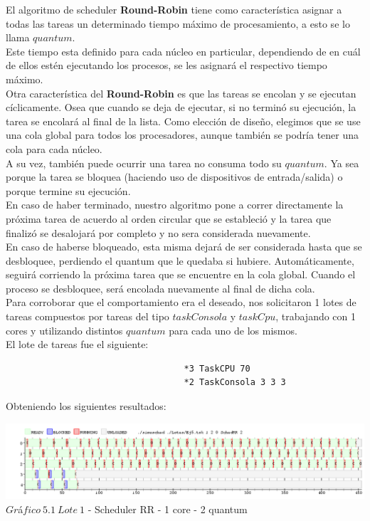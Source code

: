 \indent El algoritmo de scheduler \textbf{Round-Robin} tiene como caracter\'istica asignar a todas las tareas 
un determinado tiempo m\'aximo de procesamiento, a esto se lo llama $quantum$. \\
\indent Este tiempo esta definido para cada n\'ucleo en particular, dependiendo de en cu\'al de ellos est\'en 
ejecutando los procesos, se les asignar\'a el respectivo tiempo m\'aximo.\\
\indent Otra caracter\'istica del \textbf{Round-Robin} es que las tareas se encolan y se ejecutan c\'iclicamente. 
Osea que cuando se deja de ejecutar, si no termin\'o su ejecuci\'on, la tarea se encolar\'a al final de la lista. 
Como elecci\'on de diseño, elegimos que se use una cola global para todos los procesadores, aunque tambi\'en
se podr\'ia tener una cola para cada n\'ucleo. \\
\indent A su vez, tambi\'en puede ocurrir una tarea no consuma todo su $quantum$. 
Ya sea porque la tarea se bloquea (haciendo uso de dispositivos de entrada/salida) o porque termine su ejecuci\'on.\\
\indent En caso de haber terminado, nuestro algoritmo pone a correr directamente la pr\'oxima tarea de acuerdo al orden 
circular que se estableci\'o y la tarea que finaliz\'o se desalojar\'a por completo y no sera considerada nuevamente. \\
\indent En caso de haberse bloqueado, esta misma dejar\'a de ser considerada hasta que se desbloquee, 
perdiendo el quantum que le quedaba si hubiere. 
Autom\'aticamente, seguir\'a corriendo la pr\'oxima tarea que se encuentre en la cola global. 
Cuando el proceso se desbloquee, ser\'a encolada nuevamente al final de dicha cola.   \\

\indent Para corroborar que el comportamiento era el deseado, nos solicitaron 1 lotes de tareas compuestos por tareas
del tipo $taskConsola$ y $taskCpu$, trabajando con 1 cores y utilizando distintos $quantum$ para cada uno de los mismos.\\


El lote de tareas fue el siguiente:
\begin{verbatim}
                                   *3 TaskCPU 70
                                   *2 TaskConsola 3 3 3
\end{verbatim}

Obteniendo los siguientes resultados:

\begin{center}

    
	\includegraphics[width=450pt]{ej5quantum2.png}
	{$Gr$\'a$fico \ 5.1 \ Lote \ 1$ - Scheduler RR - 1 core - 2 quantum}	
 
\end{center}

